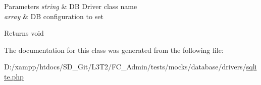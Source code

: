 \begin{DoxyParams}{Parameters}
{\em string} & D\+B Driver class name \\
\hline
{\em array} & D\+B configuration to set \\
\hline
\end{DoxyParams}
\begin{DoxyReturn}{Returns}
void 
\end{DoxyReturn}


The documentation for this class was generated from the following file\+:\begin{DoxyCompactItemize}
\item 
D\+:/xampp/htdocs/\+S\+D\+\_\+\+Git/\+L3\+T2/\+F\+C\+\_\+\+Admin/tests/mocks/database/drivers/\hyperlink{drivers_2sqlite_8php}{sqlite.\+php}\end{DoxyCompactItemize}
